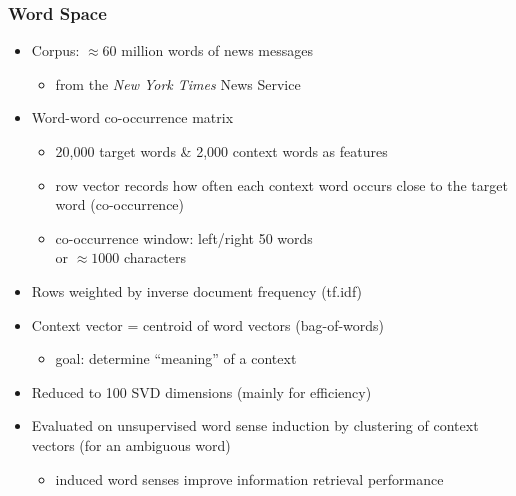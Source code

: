 \documentclass[t]{beamer} %
\begin{document}
\begin{frame}
  \frametitle{Word Space \citep{Schuetze:92,Schuetze:93,Schuetze:98}}

  \begin{itemize}
  \item Corpus: $\approx 60$ million words of news messages
    \begin{itemize}
    \item from the \emph{New York Times} News Service
    \end{itemize}
  \item Word-word co-occurrence matrix
    \begin{itemize}
    \item 20,000 target words \& 2,000 context words as features
    \item row vector records how often each context word occurs close
      to the target word (co-occurrence)
    \item co-occurrence window: left/right 50 words \citep{Schuetze:98}\\
      or $\approx 1000$ characters \citep{Schuetze:92}
    \end{itemize}
  \item Rows weighted by inverse document frequency (tf.idf)
  \item Context vector = centroid of word vectors (bag-of-words)
    \begin{itemize}
    \item[\hand] goal: determine ``meaning'' of a context
    \end{itemize}
  \item Reduced to 100 SVD dimensions (mainly for efficiency)
  \item Evaluated on unsupervised word sense induction by clustering
    of context vectors (for an ambiguous word)
    \begin{itemize}
    \item induced word senses improve information retrieval performance
    \end{itemize}
  \end{itemize}
\end{frame}
\end{document}
